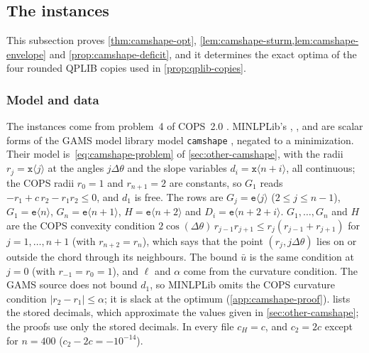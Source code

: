 \subsection{The  instances}\label{app:camshape}

This subsection proves \cref{thm:camshape-opt}, \cref{lem:camshape-sturm,lem:camshape-envelope} and \cref{prop:camshape-deficit}, and it determines the exact optima of the four rounded QPLIB copies used in \cref{prop:qplib-copies}.

\subsubsection{Model and data}\label{app:camshape-model}

The instances come from problem~4 of COPS~2.0 \citep{dolan2001-benchmarking-optimization-software-with-cops}.
MINLPLib's , ,  and  are scalar forms of the GAMS model library model \texttt{camshape} \citep{library2026-cops-and-gams-source-models}, negated to a minimization.
Their model is~\eqref{eq:camshape-problem} of \cref{sec:other-camshape}, with the radii $r_j = \texttt{x}\langle j\rangle$ at the angles $j\Delta\theta$ and the slope variables $d_i = \texttt{x}\langle n+i\rangle$, all continuous; the COPS radii $r_0 = 1$ and $r_{n+1} = 2$ are constants, so $G_1$ reads $-r_1 + c\,r_2 - r_1 r_2 \le 0$, and $d_1$ is free.
The rows are $G_j = \texttt{e}\langle j\rangle$ ($2 \le j \le n-1$), $G_1 = \texttt{e}\langle n\rangle$, $G_n = \texttt{e}\langle n+1\rangle$, $H = \texttt{e}\langle n+2\rangle$ and $D_i = \texttt{e}\langle n+2+i\rangle$.
$G_1,\dots,G_n$ and $H$ are the COPS convexity condition $2\cos(\Delta\theta)\,r_{j-1}r_{j+1} \le r_j(r_{j-1}+r_{j+1})$ for $j = 1,\dots,n+1$ (with $r_{n+2} = r_n$), which says that the point $(r_j, j\Delta\theta)$ lies on or outside the chord through its neighbours.
The bound $\bar u$ is the same condition at $j = 0$ (with $r_{-1} = r_0 = 1$), and $\ell$ and $\alpha$ come from the curvature condition.
The GAMS source does not bound $d_1$, so MINLPLib omits the COPS curvature condition $|r_2 - r_1| \le \alpha$; it is slack at the optimum (\cref{app:camshape-proof}).
 lists the stored decimals, which approximate the values given in \cref{sec:other-camshape}; the proofs use only the stored decimals.
In every file $c_H = c$, and $c_2 = 2c$ except for $n = 400$ ($c_2 - 2c = -10^{-14}$).

